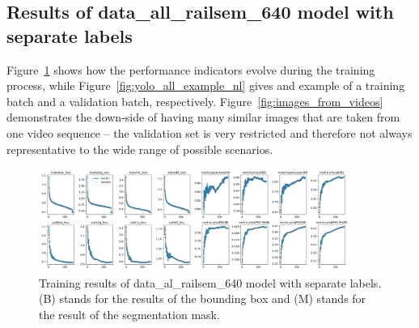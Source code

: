 \documentclass[Master,MDS,english]{BASE/twbook} %
\begin{document}
\subsection{Results of data\_all\_railsem\_640 model with separate labels}

Figure~\ref{fig:training_all_nl} shows how the performance indicators evolve during the training process, while Figure~\ref{fig:yolo_all_example_nl} gives and example of a training batch and a validation batch, respectively.
Figure~\ref{fig:images_from_videos} demonstrates the down-side of having many similar images that are taken from one video sequence -- the validation set is very restricted and therefore not always representative to the wide range of possible scenarios.


\begin{figure}[h]
\centering
\includegraphics[width=0.9\textwidth]{images/yolo/all_nl/results}
\caption{Training results of data\_al\_railsem\_640 model with separate labels. (B) stands for the results of the bounding box and (M) stands for the result of the segmentation mask.}
\label{fig:training_all_nl}
\end{figure}
\end{document}
